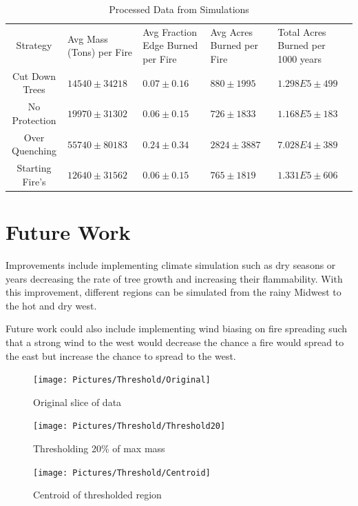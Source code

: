 \documentclass[ aps, pra, reprint, notitlepage ]{revtex4-1}
\begin{document}
\begin{table}[b]%
	\caption{\label{ProcessedData}Processed Data from Simulations}
	\begin{ruledtabular}
		\begin{tabular}{c||p{3cm}|p{3cm}|p{3cm}|p{3cm}}
			Strategy&
			Avg Mass (Tons) per Fire&
			Avg Fraction Edge Burned per Fire&
			Avg Acres Burned per Fire&
			Total Acres Burned per 1000 years\\
			\colrule
			Cut Down Trees & $14540 \pm 34218$ & $0.07 \pm 0.16$ & $880 \pm 1995$ & $1.298E5 \pm 499$\\
			No Protection & $19970 \pm 31302$ & $0.06 \pm 0.15$ & $726 \pm 1833$ & $1.168E5 \pm 183$\\
			Over Quenching & $55740 \pm 80183$ & $0.24 \pm 0.34	$ & $2824 \pm 3887$ & $7.028E4 \pm 389$\\
			Starting Fire’s & $12640 \pm 31562$ & $0.06 \pm 0.15$ & $765 \pm 1819$ & $1.331E5 \pm 606$\\
		\end{tabular}
	\end{ruledtabular}
\end{table}


\section{\label{FutureWork}Future Work}

Improvements include implementing climate simulation such as dry seasons or years decreasing the rate of tree growth and increasing their flammability. With this improvement, different regions can be simulated from the rainy Midwest to the hot and dry west.

Future work could also include implementing wind biasing on fire spreading such that a strong wind to the west would decrease the chance a fire would spread to the east but increase the chance to spread to the west.\cite{WindFire}

\begin{figure}[ht]
	\texttt{[image: Pictures/Threshold/Original]}
	\caption{\label{ThreshOrig} Original slice of data}
\end{figure}
\begin{figure}[ht]
	\texttt{[image: Pictures/Threshold/Threshold20]}
	\caption{\label{Thresh20} Thresholding 20\% of max mass}
\end{figure}
\begin{figure}[ht]
	\texttt{[image: Pictures/Threshold/Centroid]}
	\caption{\label{Centroid} Centroid of thresholded region}
\end{figure}
\end{document}
